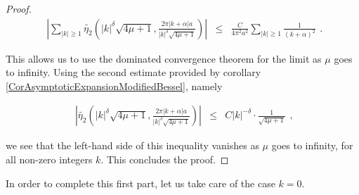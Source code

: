 \documentclass{jams-l}
\theoremstyle{definition}
\theoremstyle{remark}
\numberwithin{equation}{section}
\begin{document}
\begin{proof}
                \[ \begin{array}{lll}
                        \left \vert \sum\limits_{\left \vert k \right \vert \geqslant 1} \widetilde{\eta_2} \left( \left \vert k \right \vert^{\delta} \sqrt{4 \mu + 1}, \frac{2 \pi \left \vert k + \alpha \right \vert a}{\left \vert k \right \vert^{\delta} \sqrt{4 \mu + 1}} \right) \right \vert & \leqslant & \frac{C}{4 \pi^2 a^2} \sum\limits_{\left \vert k \right \vert \geqslant 1} \frac{1}{\left( k + \alpha \right)^2}
                    \end{array} . \]
                
                \noindent This allows us to use the dominated convergence theorem for the limit as $\mu$ goes to infinity. Using the second estimate provided by corollary \ref{CorAsymptoticExpansionModifiedBessel}, namely
                
                \[ \begin{array}{lll}
                        \left \vert \widetilde{\eta_2} \left( \left \vert k \right \vert^{\delta} \sqrt{4 \mu + 1}, \frac{2 \pi \left \vert k + \alpha \right \vert a}{\left \vert k \right \vert^{\delta} \sqrt{4 \mu + 1}} \right) \right \vert & \leqslant & C \left \vert k \right \vert^{- \delta} \cdot \frac{1}{\sqrt{4 \mu + 1}}
                    \end{array} , \]
                
                \noindent we see that the left-hand side of this inequality vanishes as $\mu$ goes to infinity, for all non-zero integers $k$. This concludes the proof.
            
            \end{proof}
            
            In order to complete this first part, let us take care of the case $k=0$.
            
\end{document}
